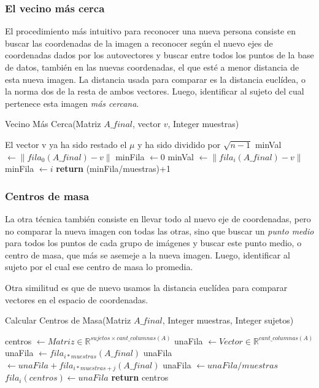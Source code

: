 \subsubsection{El vecino más cerca}
El procedimiento más intuitivo para reconocer una nueva persona consiste en buscar las coordenadas
de la imagen a reconocer según el nuevo ejes de coordenadas dados por los autovectores y buscar
entre todos los puntos de la base de datos, también en las nuevas coordenadas, el que esté a menor
distancia de esta nueva imagen. La distancia usada para comparar es la distancia euclídea, o la
norma dos de la resta de ambos vectores. Luego, identificar al sujeto del cual pertenece esta imagen
\textit{más cercana}.



\begin{algorithm}[H]
\caption{Vecino Más Cerca(Matriz $A\_final$, vector $v$, Integer muestras)}
\label{pseudo:vecino-mas-cerca}
\begin{algorithmic}
\REQUIRE El vector v ya ha sido restado el $\mu$ y ha sido dividido por $\sqrt{n-1}$
  \STATE minVal $\leftarrow \| fila_0(A\_final)- v \| $
  \STATE minFila $\leftarrow 0$ 
      \STATE minVal $\leftarrow \| fila_i(A\_final)- v \| $
      \STATE minFila $\leftarrow i$
    \ENDIF
  \ENDFOR
  \STATE \textbf{return} (minFila/muestras)+1
\end{algorithmic}
\end{algorithm}

\subsubsection{Centros de masa}
La otra técnica también consiste en llevar todo al nuevo eje de coordenadas, pero no comparar la
nueva imagen con todas las otras, sino que buscar un \textit{punto medio} para todos los puntos de
cada grupo de imágenes y buscar este punto medio, o centro de masa, que más se asemeje a la nueva
imagen. Luego, identificar al sujeto por el cual ese centro de masa lo promedia.

Otra similitud es que de nuevo usamos la distancia euclídea para comparar vectores en el espacio de
coordenadas.
\begin{algorithm}[H]
\caption{Calcular Centros de Masa(Matriz $A\_final$, Integer muestras, Integer sujetos)}
\label{pseudo:vecino-mas-cerca}
\begin{algorithmic}
  \STATE centros $\leftarrow Matriz \in \mathbb{R}^{sujetos \times cant\_columnas(A)} $
  \STATE unaFila $\leftarrow Vector \in \mathbb{R}^{cant\_columnas(A)} $
    \STATE unaFila $\leftarrow fila_{i*muestras}(A\_final) $
      \STATE unaFila $\leftarrow unaFila + fila_{i*muestras+j}(A\_final) $
    \ENDFOR
    \STATE unaFila $\leftarrow unaFila/muestras$
    \STATE $fila_i(centros) \leftarrow unaFila$
  \ENDFOR
  \STATE \textbf{return} centros
\end{algorithmic}
\end{algorithm}

